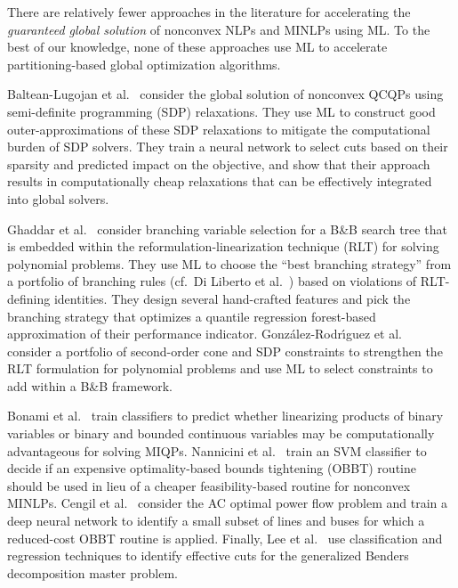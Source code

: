 \documentclass{article}
\begin{document}
There are relatively fewer approaches in the literature for accelerating the \textit{guaranteed global solution} of nonconvex NLPs and MINLPs using ML. 
To the best of our knowledge, none of these approaches use ML to accelerate partitioning-based global optimization algorithms.


Baltean-Lugojan et al.\ \cite{baltean2019scoring} consider the global solution of nonconvex QCQPs using semi-definite programming (SDP) relaxations.
They use ML to construct good outer-approximations of these SDP relaxations to mitigate the computational burden of SDP solvers.
They train a neural network to select cuts based on their sparsity and predicted impact on the objective, 
and show that their approach results in computationally cheap relaxations that can be effectively integrated into global solvers.

Ghaddar et al.\ \cite{ghaddar2022learning} consider branching variable selection for a B\&B search tree that is embedded within the reformulation-linearization technique (RLT) for solving polynomial problems.
They use ML to choose the ``best branching strategy'' from a portfolio of branching rules (cf.\ Di Liberto et al.\ \cite{di2016dash}) based on violations of RLT-defining identities.
They design several hand-crafted features and pick the branching strategy that optimizes a quantile regression forest-based approximation of their performance indicator.
Gonz{\'a}lez-Rodr{\'\i}guez et al.\ \cite{gonzalez2022polynomial} consider a portfolio of second-order cone and SDP constraints to strengthen the RLT formulation for polynomial problems and use ML to select constraints to add within a B\&B framework.


Bonami et al.\ \cite{bonami2018learning} train classifiers to predict whether linearizing products of binary variables or binary and bounded continuous variables may be computationally advantageous for solving MIQPs.
Nannicini et al.\ \cite{nannicini2011probing} train an SVM classifier to decide if an expensive optimality-based bounds tightening (OBBT) routine should be used in lieu of a cheaper feasibility-based routine for nonconvex MINLPs.
Cengil et al.\ \cite{cengil2022learning} consider the AC optimal power flow  problem and train a deep neural network to identify a small subset of lines and buses for which a reduced-cost OBBT routine is applied.
Finally, Lee et al.\ \cite{lee2020accelerating} use classification and regression techniques to identify effective cuts for the generalized Benders decomposition master problem. 
\end{document}
